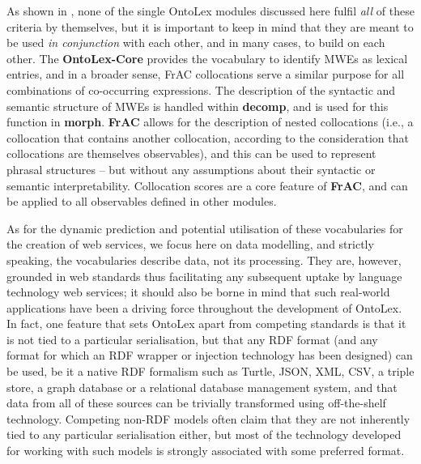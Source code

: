 \documentclass[output=paper,colorlinks,citecolor=brown]{langscibook}
\begin{document}
As shown in , none of the single OntoLex modules discussed here fulfil \emph{all} of these criteria by themselves, but it is important to keep in mind that they are meant to be used \emph{in conjunction} with each other, and in many cases, to build on each other. The \textbf{OntoLex-Core} provides the vocabulary to identify MWEs as lexical entries, and in a broader sense, FrAC collocations serve a similar purpose for all combinations of co-occurring expressions.
The description of the syntactic and semantic structure of MWEs is handled within \textbf{decomp}, and  is used for this function in \textbf{morph}. \textbf{FrAC} allows for the description of nested collocations (i.e., a collocation that contains another collocation, according to the consideration that collocations are themselves observables), and this can be used to represent phrasal structures -- but without any assumptions about their syntactic or semantic interpretability.
Collocation scores are a core feature of \textbf{FrAC}, and can be applied to all observables defined in other modules.

As for the dynamic prediction and potential utilisation of these vocabularies for the creation of web services,  we focus here on data modelling, and strictly speaking, the vocabularies describe data, not its processing. They are, however, grounded in web standards thus facilitating any subsequent uptake by language technology web services; it should also be borne in mind that such real-world applications have been a driving force throughout the development of OntoLex.
In fact, one feature that sets OntoLex apart from competing standards is that it is not tied to a particular serialisation, but that any RDF format (and any format for which an RDF wrapper or injection technology has been designed) can be used, be it a native RDF formalism such as Turtle, JSON, XML, CSV, a triple store, a graph database or a relational database management system, and that data from all of these sources can be trivially transformed using off-the-shelf technology. Competing non-RDF models often claim that they are not inherently tied to any particular serialisation either, but most of the technology developed for working with such models is strongly associated with some preferred format.
\end{document}
